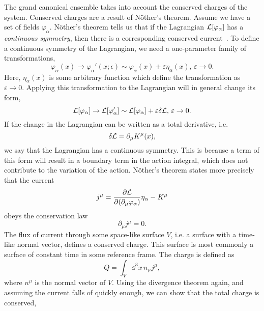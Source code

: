 The grand canonical ensemble takes into account the conserved charges of the system.
Conserved charges are a result of Nöther's theorem.
Assume we have a set of fields $\varphi_\alpha$. Nöther's theorem tells us that if the Lagrangian $\mathcal{L}[\varphi_\alpha]$ has a \emph{continuous symmetry}, then there is a corresponding conserved current~\cite{Peskin:IntroQFT,Carroll:spacetime}.
To define a continuous symmetry of the Lagrangian, we need a one-parameter family of transformations,
\begin{equation*}
    \varphi_\alpha(x) \longrightarrow \varphi_\alpha'(x; \epsilon)
    \sim \varphi_\alpha(x) + \varepsilon \eta_\alpha(x), \, \varepsilon \rightarrow 0.
\end{equation*}
Here, $\eta_\alpha(x)$ is some arbitrary function which define the transformation as $\varepsilon \rightarrow 0$.
Applying this transformation to the Lagrangian will in general change its form,
\begin{equation*}
    \mathcal{L}[\varphi_\alpha] \rightarrow \mathcal{L}[\varphi_\alpha']
    \sim \mathcal{L}[\varphi_\alpha] + \varepsilon \delta \mathcal{L}, \,
    \varepsilon \rightarrow 0.
\end{equation*}
If the change in the Lagrangian can be written as a total derivative, i.e.
\begin{equation*}
    \delta \mathcal{L} = \partial_\mu K^\mu(x),
\end{equation*}
we say that the Lagrangian has a continuous symmetry.
This is because a term of this form will result in a boundary term in the action integral, which does not contribute to the variation of the action.
Nöther's theorem states more precisely that the current
\begin{equation}
    j^\mu = \pdv{\mathcal{L}}{(\partial_\mu \varphi_\alpha)} \eta_\alpha - K^\mu
\end{equation}
obeys the conservation law
\begin{equation}
    \partial_\mu j^\mu = 0.
\end{equation}
The flux of current through some space-like surface $V$, i.e. a surface with a time-like normal vector, defines a conserved charge. This surface is most commonly a surface of constant time in some reference frame. 
The charge is defined as
\begin{equation}
    Q = \int_V \dd^3 x\, n_\mu j^\mu,
\end{equation}
where $n^\mu$ is the normal vector of $V$.
Using the divergence theorem again, and assuming the current falls of quickly enough, we can show that the total charge is conserved,
